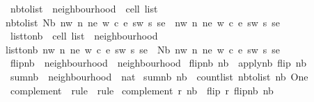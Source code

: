 \begin{isabellebody}
\isanewline
{}\isamarkupfalse%
\ nb{\isacharunderscore}to{\isacharunderscore}list\ {\isacharcolon}{\isacharcolon}\ {\isachardoublequoteopen}neighbourhood\ {\isasymRightarrow}\ cell\ list{\isachardoublequoteclose}\ \isanewline
{\isachardoublequoteopen}nb{\isacharunderscore}to{\isacharunderscore}list\ {\isacharparenleft}Nb\ nw\ n\ ne\ w\ c\ e\ sw\ s\ se{\isacharparenright}\ {\isacharequal}\ {\isacharbrackleft}nw{\isacharcomma}\ n{\isacharcomma}\ ne{\isacharcomma}\ w{\isacharcomma}\ c{\isacharcomma}\ e{\isacharcomma}\ sw{\isacharcomma}\ s{\isacharcomma}\ se{\isacharbrackright}{\isachardoublequoteclose}\isanewline
\isanewline
\isanewline
{}\isamarkupfalse%
\ list{\isacharunderscore}to{\isacharunderscore}nb\ {\isacharcolon}{\isacharcolon}\ {\isachardoublequoteopen}cell\ list\ {\isasymRightarrow}\ neighbourhood{\isachardoublequoteclose}\ \isanewline
{\isachardoublequoteopen}list{\isacharunderscore}to{\isacharunderscore}nb\ {\isacharbrackleft}nw{\isacharcomma}\ n{\isacharcomma}\ ne{\isacharcomma}\ w{\isacharcomma}\ c{\isacharcomma}\ e{\isacharcomma}\ sw{\isacharcomma}\ s{\isacharcomma}\ se{\isacharbrackright}\ {\isacharequal}\ Nb\ nw\ n\ ne\ w\ c\ e\ sw\ s\ se{\isachardoublequoteclose}\isanewline
\isanewline
\isanewline
{}\isamarkupfalse%
\ flip{\isacharunderscore}nb\ {\isacharcolon}{\isacharcolon}\ {\isachardoublequoteopen}neighbourhood\ {\isasymRightarrow}\ neighbourhood{\isachardoublequoteclose}\ \isanewline
{\isachardoublequoteopen}flip{\isacharunderscore}nb\ nb\ {\isacharequal}\ apply{\isacharunderscore}nb\ flip\ nb{\isachardoublequoteclose}\isanewline
\isanewline
{}\isamarkupfalse%
\ sum{\isacharunderscore}nb\ {\isacharcolon}{\isacharcolon}\ {\isachardoublequoteopen}neighbourhood\ {\isasymRightarrow}\ nat{\isachardoublequoteclose}\ \isanewline
{\isachardoublequoteopen}sum{\isacharunderscore}nb\ nb\ {\isacharequal}\ count{\isacharunderscore}list\ {\isacharparenleft}nb{\isacharunderscore}to{\isacharunderscore}list\ nb{\isacharparenright}\ One{\isachardoublequoteclose}\isanewline
\isanewline
{}\isamarkupfalse%
\ complement\ {\isacharcolon}{\isacharcolon}\ {\isachardoublequoteopen}rule\ {\isasymRightarrow}\ rule{\isachardoublequoteclose}\ \isanewline
{\isachardoublequoteopen}complement\ r\ nb\ {\isacharequal}\ flip\ {\isacharparenleft}r\ {\isacharparenleft}flip{\isacharunderscore}nb\ nb{\isacharparenright}{\isacharparenright}{\isachardoublequoteclose}\isanewline
\isanewline
{}\isamarkupfalse%

\end{isabellebody}
